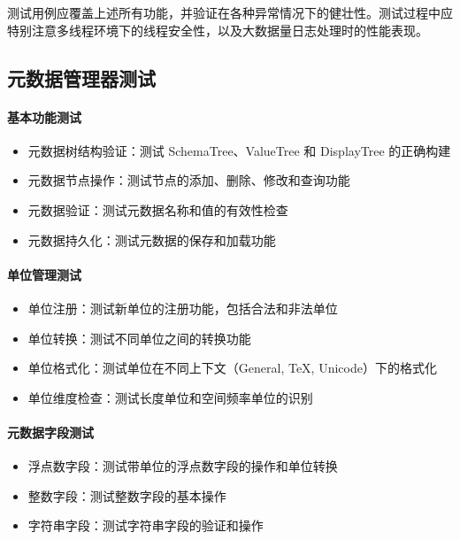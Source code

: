 \documentclass[a4paper,12pt]{report}	%
\begin{document}
测试用例应覆盖上述所有功能，并验证在各种异常情况下的健壮性。测试过程中应特别注意多线程环境下的线程安全性，以及大数据量日志处理时的性能表现。


\subsection{元数据管理器测试}

\paragraph{基本功能测试}
\begin{itemize}
    \item 元数据树结构验证：测试 SchemaTree、ValueTree 和 DisplayTree 的正确构建
    \item 元数据节点操作：测试节点的添加、删除、修改和查询功能
    \item 元数据验证：测试元数据名称和值的有效性检查
    \item 元数据持久化：测试元数据的保存和加载功能
\end{itemize}

\paragraph{单位管理测试}
\begin{itemize}
    \item 单位注册：测试新单位的注册功能，包括合法和非法单位
    \item 单位转换：测试不同单位之间的转换功能
    \item 单位格式化：测试单位在不同上下文（General, TeX, Unicode）下的格式化
    \item 单位维度检查：测试长度单位和空间频率单位的识别
\end{itemize}

\paragraph{元数据字段测试}
\begin{itemize}
    \item 浮点数字段：测试带单位的浮点数字段的操作和单位转换
    \item 整数字段：测试整数字段的基本操作
    \item 字符串字段：测试字符串字段的验证和操作
\end{itemize}
\end{document}
